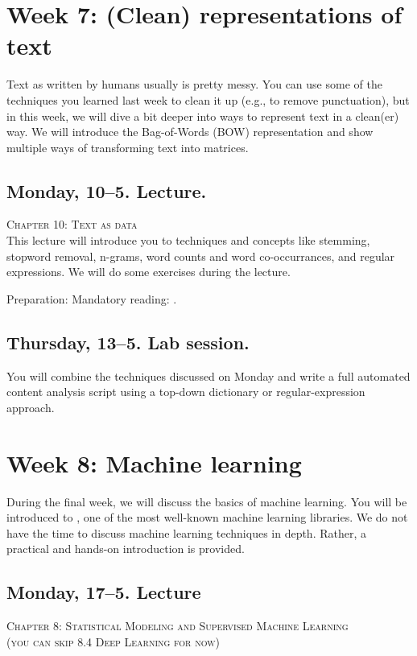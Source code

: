 \section*{Week 7: (Clean) representations of text}

Text as written by humans usually is pretty messy. You can use some of the techniques you learned last week to clean it up (e.g., to remove punctuation), but in this week, we will dive a bit deeper into ways to represent text in a clean(er) way. We will introduce the Bag-of-Words (BOW) representation and show multiple ways of transforming text into matrices.

\subsection*{Monday, 10--5. Lecture.}
\textsc{ Chapter 10: Text as data}\\
This lecture will introduce you to techniques and concepts like stemming, stopword removal, n-grams, word counts and word co-occurrances, and regular expressions. We will do some exercises during the lecture.

Preparation: Mandatory reading: \cite{Boumans2016}.

\subsection*{Thursday, 13--5. Lab session.}
You will combine the techniques discussed on Monday and write a full automated content analysis script using a top-down dictionary or regular-expression approach.

\section*{Week 8: Machine learning}
During the final week, we will discuss the basics of machine learning. You will be introduced to \citep{scikit-learn}, one of the most well-known machine learning libraries. We do not have the time to discuss machine learning techniques in depth. Rather, a practical and hands-on introduction is provided. 

\subsection*{Monday, 17--5. Lecture}
\textsc{ Chapter 8: Statistical Modeling and Supervised Machine Learning}\\
\textsc{ (you can skip 8.4 Deep Learning for now)}\\

